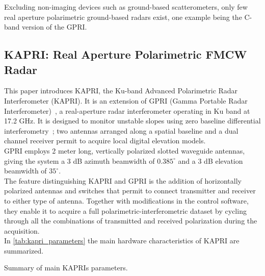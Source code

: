 Excluding non-imaging devices such as ground-based scatterometers, only few real aperture polarimetric ground-based radars exist, one example being the C-band version of the GPRI\cite{Cherukumilli2012}.
\subsection{KAPRI: Real Aperture Polarimetric FMCW Radar}
This paper introduces KAPRI, the Ku-band  Advanced Polarimetric Radar Interferometer (KAPRI)\cite{Baffelli2016a}. It is an extension of GPRI (Gamma Portable Radar Interferometer)~\cite{werner_gpri_2012,Strozzi2011, Werner2008}, a real-aperture radar interferometer operating in Ku band at 17.2 GHz. It is designed 
to monitor unstable slopes using zero baseline differential interferometry~\cite{Massonnet1993}; two antennas arranged along a spatial baseline and a dual channel receiver permit to acquire local digital elevation models.\\
GPRI employs  2 meter long, vertically polarized slotted waveguide antennas, giving the system a 3 dB azimuth beamwidth of $0.385^\circ$ and a 3 dB elevation beamwidth of $35^\circ$.\\
The feature distinguishing KAPRI and GPRI is the addition of horizontally polarized antennas and switches that permit to connect transmitter and receiver to either type of antenna. Together with modifications in the control software, they enable it to acquire a full polarimetric-interferometric dataset by cycling through all the combinations of transmitted and received polarization during the acquisition.\\  In \autoref{tab:kapri_parameters} the main hardware characteristics of KAPRI are summarized.
\begin{table*}
	\centering
	\caption{Summary of main KAPRIs parameters.}
	\label{tab:kapri_parameters}
\end{table*}
